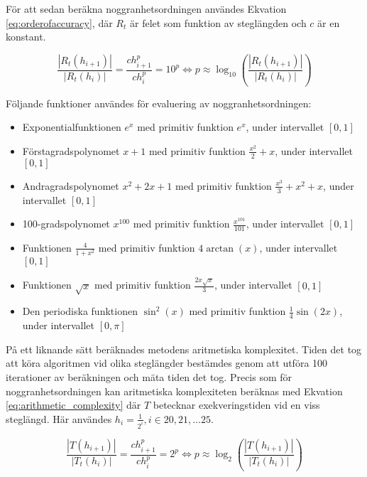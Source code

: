 \documentclass[a4paper,titlepage]{article}
\begin{document}
För att sedan beräkna noggranhetsordningen användes Ekvation
\ref{eq:orderofaccuracy}, där $R_t$
är felet som funktion av steglängden och $c$ är en konstant.

\begin{equation}
    \label{eq:orderofaccuracy}
    \frac{| R_t(h_{i+1})|}{| R_t(h_{i})|}  = \frac{ch_{i+1}^p}{ch_{i}^p} = 10^p
    \Leftrightarrow p \approx \log_{10}\left( \frac{| R_t(h_{i+1})|}{| R_t(h_{i})|} \right)
\end{equation}

Följande funktioner användes för evaluering av noggranhetsordningen:

\begin{itemize}
    \item Exponentialfunktionen $e^x$ med primitiv funktion $e^x$, under intervallet $[0, 1]$
    \item Förstagradspolynomet $x + 1$ med primitiv funktion $\frac{x^2}{2} + x$, under intervallet $[0, 1]$
    \item Andragradspolynomet $x^2 + 2x + 1$ med primitiv funktion
        $\frac{x^3}{3} + x^2 + x$, under intervallet $[0, 1]$
    \item 100-gradspolynomet $x^{100}$ med primitiv funktion
        $\frac{x^{101}}{101}$, under intervallet $[0, 1]$
    \item Funktionen $\frac{4}{1 + x^2}$ med primitiv funktion $4\arctan(x)$, under intervallet $[0, 1]$
    \item Funktionen $\sqrt x$ med primitiv funktion $\frac{2 x\sqrt x}{3}$, under intervallet $[0, 1]$
    \item Den periodiska funktionen $\sin^2(x)$ med primitiv funktion
        $\frac{1}{4}\sin(2x)$, under intervallet $[0, \pi]$
\end{itemize}

På ett liknande sätt beräknades metodens aritmetiska komplexitet. Tiden det tog att köra
algoritmen vid olika steglängder bestämdes genom att utföra 100 iterationer av beräkningen
och mäta tiden det tog. Precis som för noggranhetsordningen kan aritmetiska komplexiteten
beräknas med Ekvation \ref{eq:arithmetic_complexity} där $T$ betecknar exekveringstiden
vid en viss steglängd. Här användes $h_i = \frac{1}{2^i}, i \in {20,21, \dots
25}$.

\begin{equation}
    \label{eq:arithmetic_complexity}
    \frac{| T(h_{i+1})|}{| T_t(h_{i})|}  = \frac{ch_{i+1}^p}{ch_{i}^p} = 2^p
    \Leftrightarrow p \approx \log_{2}\left( \frac{| T(h_{i+1})|}{| T_t(h_{i})|} \right)
\end{equation}
\end{document}
